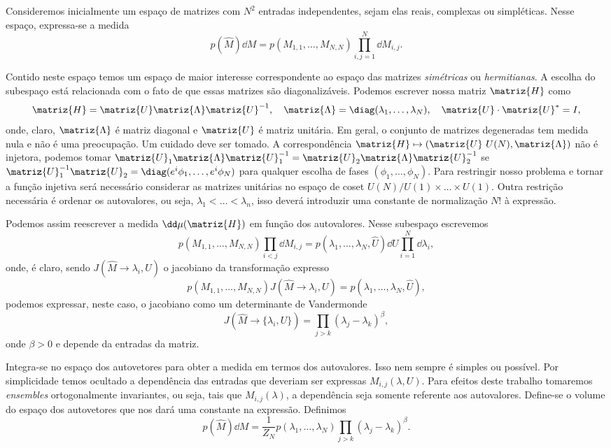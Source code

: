 Consideremos inicialmente um espaço de matrizes com $N^2$ entradas independentes, sejam elas reais, complexas ou simpléticas. Nesse espaço, expressa-se a medida
\begin{equation}
	p(\hat{M}) \dd M = p(M_{1,1}, \dots, M_{N,N}) \prod_{i,j=1}^{N} \dd M_{i,j}.
\end{equation}

Contido neste espaço temos um espaço de maior interesse correspondente ao espaço das matrizes \textit{simétricas} ou \textit{hermitianas}. A escolha do subespaço está relacionada com o fato  de que essas matrizes são diagonalizáveis. Podemos escrever nossa matriz $\matriz{H}$ como 
\[
\matriz{H} = \matriz{U} \matriz{\Lambda} \matriz{U}^{-1}, \quad \matriz{\Lambda} = \diag(\lambda_1, \dots, \lambda_N), \quad \matriz{U}\cdot\matriz{U}^* = I,
\]
onde, claro, $\matriz{\Lambda}$ é matriz diagonal e $\matriz{U}$ é matriz unitária. Em geral, o conjunto de matrizes degeneradas tem medida nula e não é uma preocupação.  Um cuidado deve ser tomado. A correspondência $\matriz{H} \mapsto (\matriz{U} \ U(N), \matriz{\Lambda})$ não é injetora, podemos tomar $\matriz{U}_1 \matriz{\Lambda} \matriz{U}_1^{-1} = \matriz{U}_2 \matriz{\Lambda} \matriz{U}_2^{-1}$ se $\matriz{U}_1^{-1} \matriz{U}_2 = \diag(e^i\phi_1, \dots, e^i\phi_N)$ para qualquer escolha de fases $(\phi_1, \dots, \phi_N)$. Para restringir nosso problema e tornar a função injetiva será necessário considerar as matrizes unitárias no espaço de coset  $U(N) / U(1) \times \dots \times U(1)$.  Outra restrição necessária é ordenar os autovalores, ou seja, $\lambda_1 < \dots < \lambda_n$, isso deverá introduzir uma constante de normalização $N!$ à expressão.

Podemos assim reescrever a medida $\dd\mu(\matriz{H})$ em função dos autovalores. Nesse subespaço escrevemos
\[
	p(M_{1,1}, \dots, M_{N,N}) \prod_{i<j} \dd M_{i,j} = p(\lambda_1, \dots, \lambda_N, \hat{U}) \dd U \prod_{i=1}^N \dd\lambda_{i},
\]
onde, é claro, sendo $J(\hat{M} \rightarrow {\lambda_i, U})$ o jacobiano da transformação expresso
\[
		p(M_{1,1}, \dots, M_{N,N}) J(\hat{M} \rightarrow {\lambda_i, U})= p(\lambda_1, \dots, \lambda_N, \hat{U}),
\]
podemos expressar, neste caso, o jacobiano como um determinante de Vandermonde
\begin{equation}
	J(\hat{M} \rightarrow \{\lambda_i, U\}) = \prod_{j>k} (\lambda_j - \lambda_{k})^\beta,
\end{equation}
onde $\beta > 0$ e depende da entradas da matriz. 

Integra-se no espaço dos autovetores para obter a medida em termos dos autovalores. Isso nem sempre é simples ou possível. Por simplicidade temos ocultado a dependência das entradas que deveriam ser expressas $M_{i,j}(\lambda, U)$.  Para efeitos deste trabalho tomaremos \textit{ensembles} ortogonalmente invariantes, ou seja, tais que $M_{i,j}(\lambda)$, a dependência seja somente referente aos autovalores. Define-se o volume do espaço dos autovetores que nos dará uma constante na expressão. Definimos
\begin{equation}
	p(\hat{M}) \dd M =  \frac{1}{Z_N} p(\lambda_1, \dots, \lambda_N) \prod_{j>k} (\lambda_j - \lambda_{k})^\beta.
\end{equation}

